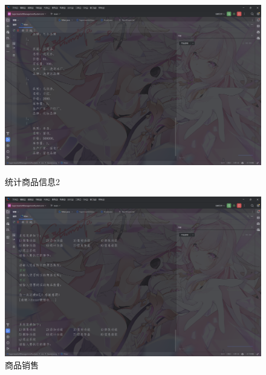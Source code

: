\documentclass[12pt, a4paper, oneside]{ctexart}
\begin{document}
\begin{figure}[H]
    \begin{minipage}[t]{0.48\textwidth}
        \includegraphics[width=\textwidth]{../images/统计商品信息2.png}
        \caption{统计商品信息2}
    \end{minipage}
    \hfill
    \begin{minipage}[t]{0.48\textwidth}
        \includegraphics[width=\textwidth]{../images/商品销售.png}
        \caption{商品销售}
    \end{minipage}
\end{figure}
\end{document}
